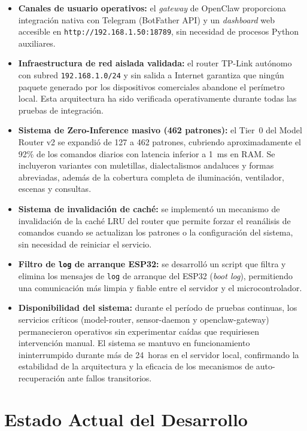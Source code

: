 \begin{itemize}
    \item \textbf{Canales de usuario operativos:} el \textit{gateway} de OpenClaw proporciona integración nativa con Telegram (BotFather API) y un \textit{dashboard} web accesible en \texttt{http://192.168.1.50:18789}, sin necesidad de procesos Python auxiliares.

    \item \textbf{Infraestructura de red aislada validada:} el router TP-Link autónomo con subred \texttt{192.168.1.0/24} y sin salida a Internet garantiza que ningún paquete generado por los dispositivos comerciales abandone el perímetro local. Esta arquitectura ha sido verificada operativamente durante todas las pruebas de integración.

    \item \textbf{Sistema de Zero-Inference masivo (462 patrones):} el Tier~0 del Model Router v2 se expandió de 127 a 462 patrones, cubriendo aproximadamente el 92\% de los comandos diarios con latencia inferior a 1~ms en RAM. Se incluyeron variantes con muletillas, dialectalismos andaluces y formas abreviadas, además de la cobertura completa de iluminación, ventilador, escenas y consultas.

    \item \textbf{Sistema de invalidación de caché:} se implementó un mecanismo de invalidación de la caché LRU del router que permite forzar el reanálisis de comandos cuando se actualizan los patrones o la configuración del sistema, sin necesidad de reiniciar el servicio.

    \item \textbf{Filtro de \texttt{log} de arranque ESP32:} se desarrolló un script que filtra y elimina los mensajes de \texttt{log} de arranque del ESP32 (\textit{boot log}), permitiendo una comunicación más limpia y fiable entre el servidor y el microcontrolador.

    \item \textbf{Disponibilidad del sistema:} durante el período de pruebas continuas, los servicios críticos (model-router, sensor-daemon y openclaw-gateway) permanecieron operativos sin experimentar caídas que requiriesen intervención manual. El sistema se mantuvo en funcionamiento ininterrumpido durante más de 24~horas en el servidor local, confirmando la estabilidad de la arquitectura y la eficacia de los mecanismos de auto-recuperación ante fallos transitorios.
\end{itemize}

\section{Estado Actual del Desarrollo}

